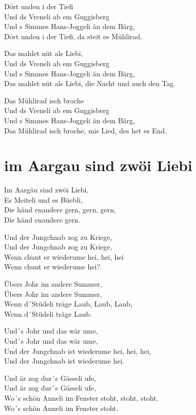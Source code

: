 \documentclass[
  letterpaper,
]{scrbook}
\begin{document}
Dört unden i der Tiefi\\
Und ds Vreneli ab em Guggisberg\\
Und s Simmes Hans-Joggeli än dem Bärg,\\
Dört unden i der Tiefi, da steit es Mühlirad.

Das mahlet nüt als Liebi,\\
Und ds Vreneli ab em Guggisberg\\
Und s Simmes Hans-Joggeli än dem Bärg,\\
Das mahlet nüt als Liebi, die Nacht und auch den Tag.

Das Mühlirad isch broche\\
Und ds Vreneli ab em Guggisberg\\
Und s Simmes Hans-Joggeli än dem Bärg,\\
Das Mühlirad isch broche, mis Lied, des het es End.

\hypertarget{im-aargau-sind-zwuxf6i-liebi}{%
\chapter{im Aargau sind zwöi Liebi}\label{im-aargau-sind-zwuxf6i-liebi}}

Im Aargäu sind zwöi Liebi,\\
Es Meiteli und es Büebli,\\
Die händ enandere gern, gern, gern,\\
Die händ enandere gern.

Und der Jungchnab zog zu Kriege,\\
Und der Jungchnab zog zu Kriege,\\
Wenn chunt er wiederume hei, hei, hei\\
Wenn chunt er wiederume hei?.

Übers Johr im andere Summer,\\
Übers Johr im andere Summer,\\
Wenn d´Stüdeli träge Laub, Laub, Laub,\\
Wenn d´Stüdeli träge Laub.

Und´s Johr und das wär ume,\\
Und´s Johr und das wär ume,\\
Und der Jungchnab ist wiederume hei, hei, hei,\\
Und der Jungchnab ist wiederume hei.

Und är zog dur´s Gässeli ufe,\\
Und är zog dur´s Gässeli ufe,\\
Wo´s schön Anneli im Fenster stoht, stoht, stoht,\\
Wo´s schön Anneli im Fenster stoht.
\end{document}
